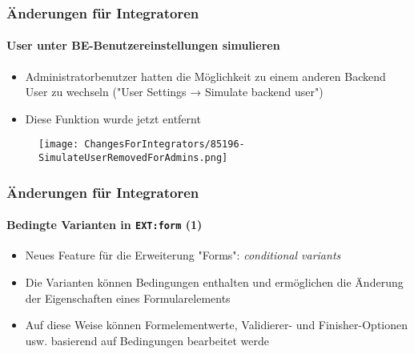 
\begin{frame}[fragile]
	\frametitle{Änderungen für Integratoren}
	\framesubtitle{User unter BE-Benutzereinstellungen simulieren}

	\begin{itemize}
		\item Administratorbenutzer hatten die Möglichkeit zu einem anderen Backend User
			zu wechseln ("User Settings → Simulate backend user")
		\item Diese Funktion wurde jetzt entfernt
	\end{itemize}

	\begin{figure}
		\texttt{[image: ChangesForIntegrators/85196-SimulateUserRemovedForAdmins.png]}
	\end{figure}

\end{frame}


\begin{frame}[fragile]
	\frametitle{Änderungen für Integratoren}
	\framesubtitle{Bedingte Varianten in \texttt{EXT:form} (1)}

	\begin{itemize}
		\item Neues Feature für die Erweiterung "Forms": \textit{conditional variants}
		\item Die Varianten können Bedingungen enthalten und ermöglichen die Änderung der Eigenschaften eines
			Formularelements
		\item Auf diese Weise können Formelementwerte, Validierer- und Finisher-Optionen usw. 
			basierend auf Bedingungen bearbeitet werde

	\end{itemize}

\end{frame}


